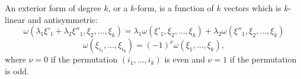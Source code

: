 An exterior form of degree $k$, or a $k$-form, is a function of $k$ vectors which is $k$-linear and antisymmetric:
$$\omega(\lambda_1 \xi'_1 + \lambda_2 \xi''_1, \xi_2, \ldots, \xi_k) = \lambda_1 \omega(\xi'_1, \xi_2, \ldots, \xi_k) + \lambda_2 \omega(\xi''_1, \xi_2, \ldots, \xi_k)$$
$$\omega(\xi_{i_1}, \ldots, \xi_{i_k}) = (-1)^\nu \omega(\xi_1, \ldots, \xi_k),$$
where $\nu = 0$ if the permutation $(i_1, \ldots, i_k)$ is even and $\nu = 1$ if the permutation is odd.
